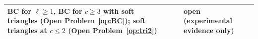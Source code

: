 {\begin{longtable}{@{}>{\raggedright\arraybackslash}p{}>{\raggedright\arraybackslash}p{}>{\raggedright\arraybackslash}p{}>{\raggedright\arraybackslash}p{}@{}}
BC for $\ell\ge1$, BC for $c\ge3$ with soft triangles (Open Problem~\ref{op:BC}); soft triangles at $c\le2$ (Open Problem~\ref{op:tri2}) & & & \textbf{open} (experimental evidence only)\\
\hline
\end{longtable}}
